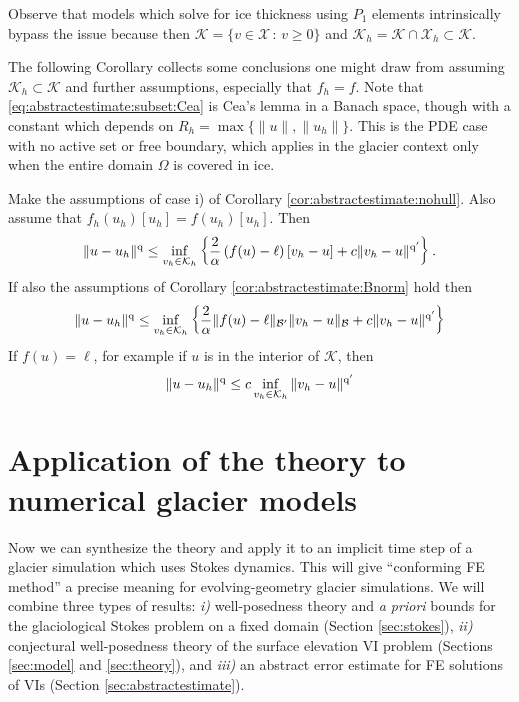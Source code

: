 \documentclass[hidelinks,onefignum,onetabnum,final]{siamart220329}  %
\newcommand{\cB}{\mathcal{B}}
\newcommand{\cK}{\mathcal{K}}
\newcommand{\cX}{\mathcal{X}}
\newcommand{\qq}{{\text{\textnormal{q}}}}
\begin{document}
Observe that models which solve for ice thickness using $P_1$ elements intrinsically bypass the issue because then $\cK = \{v\in\cX\,:\,v\ge 0\}$ and $\cK_h=\cK\cap\cX_h \subset \cK$.

The following Corollary collects some conclusions one might draw from assuming $\cK_h \subset \cK$ and further assumptions, especially that $f_h=f$.  Note that \eqref{eq:abstractestimate:subset:Cea} is Cea's lemma \cite[Theorem 2.4.1]{Ciarlet2002} in a Banach space, though with a constant which depends on $R_h=\max\{\|u\|,\|u_h\|\}$.  This is the PDE case with no active set or free boundary, which applies in the glacier context only when the entire domain $\Omega$ is covered in ice.

\begin{corollary}  \label{cor:abstractestimate:various}  Make the assumptions of case i) of Corollary \ref{cor:abstractestimate:nohull}.  Also assume that $f_h(u_h)[u_h] = f(u_h)[u_h]$.  Then
\begin{equation}
\|u-u_h\|^\qq \le  \inf_{v_h\in\cK_h} \left\{\frac{2}{\alpha} \left(f(u)-\ell\right)[v_h-u] + c \|v_h - u\|^{\qq'}\right\}. \label{eq:abstractestimate:subset}
\end{equation}
If also the assumptions of Corollary \ref{cor:abstractestimate:Bnorm} hold then
\begin{equation}
\|u-u_h\|^\qq \le \inf_{v_h\in\cK_h} \left\{\frac{2}{\alpha} \|f(u)-\ell\|_{\cB'} \|v_h-u\|_{\cB} + c \|v_h-u\|^{\qq'}\right\} \label{eq:abstractestimate:subset:Bnorm}
\end{equation}
If $f(u)=\ell$, for example if $u$ is in the interior of $\cK$, then
\begin{equation}
\|u-u_h\|^\qq \le c \inf_{v_h\in\cK_h} \|v_h-u\|^{\qq'} \label{eq:abstractestimate:subset:Cea}
\end{equation}
\end{corollary}


\section{Application of the theory to numerical glacier models} \label{sec:application}

Now we can synthesize the theory and apply it to an implicit time step of a glacier simulation which uses Stokes dynamics.  This will give ``conforming FE method'' a precise meaning for evolving-geometry glacier simulations.  We will combine three types of results: \emph{i)} well-posedness theory and \emph{a priori} bounds for the glaciological Stokes problem on a fixed domain (Section \ref{sec:stokes}), \emph{ii)} conjectural well-posedness theory of the surface elevation VI problem (Sections \ref{sec:model} and \ref{sec:theory}), and \emph{iii)} an abstract error estimate for FE solutions of VIs (Section \ref{sec:abstractestimate}).
\end{document}
